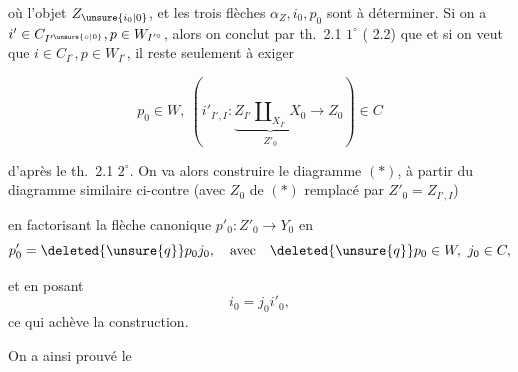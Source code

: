 
où l'objet $Z_{\unsure{i_0|0}}$, et les trois flèches $\alpha_Z,i_0,p_0$ sont à déterminer. Si on a $i'\in C_{I'^{\unsure{\circ|0}}},p\in W_{I'^\circ}$, alors on conclut par th.~2.1 $1^\circ$ ( 2.2) que  et si on veut que $i\in C_{I^\circ},p\in W_{I^\circ}$, il reste seulement à exiger 

\[
 p_0\in W,\ (i'_{I',I}:\underbrace{Z_{I'}\amalg_{X_{I'}}X_0}_{Z'_0}\longrightarrow Z_0)\in C
\]

d'après le th.~2.1 $2^\circ$. On va alors construire le diagramme $(*)$, à partir du diagramme similaire ci-contre (avec $Z_0$ de $(*)$ remplacé par $Z'_0=Z_{I',I}$)


en factorisant la flèche canonique $p'_0:Z'_0\longrightarrow Y_0$ en 
\[
 p'_0=\deleted{\unsure{q}}p_0j_0,\quad\text{avec}\quad \deleted{\unsure{q}}p_0\in W,\ j_0\in C,
\]

et en posant
\[
 i_0=j_0i'_0,
\]
ce qui achève la construction.

On a ainsi prouvé le
